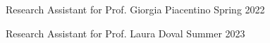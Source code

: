 

\begin{cventries}

\cventrysimple
    {Research Assistant for Prof. Giorgia Piacentino}  %
    {Spring 2022} %
    {}
	
\cventrysimple
	{Research Assistant for Prof. Laura Doval}  %
    {Summer 2023} %
    {}
    
\end{cventries}
